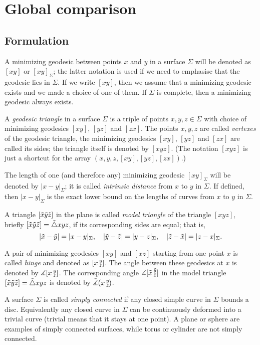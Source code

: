 \chapter{Global comparison}

\section{Formulation}

A minimizing geodesic between points $x$ and $y$ in a surface $\Sigma$ will be denoted as $[xy]$ or $[xy]_\Sigma$;
the latter notation is used if we need to emphasise that the geodesic lies in $\Sigma$.
If we write $[xy]$, then we assume that a minimizing geodesic exists and we made a choice of one of them.
If $\Sigma$ is complete, then a minimizing geodesic always exists. %

A \emph{geodesic triangle} in a surface $\Sigma$ is a triple of points $x,y,z\in \Sigma$ with choice of minimizing geodesics $[xy]$, $[yz]$ and $[zx]$.
The points $x,y,z$ are called \emph{vertexes} of the geodesic triangle,
the minimizing geodesics $[xy]$, $[yz]$ and $[zx]$ are called its sides;
the triangle itself is denoted by $[xyz]$.
(The notation $[xyz]$ is just a shortcut for the array $(x,y,z,[xy], [yz], [zx])$.)

The length of one (and therefore any) minimizing geodesic $[xy]_\Sigma$ will be denoted by $|x-y|_\Sigma$; it is called \emph{intrinsic distance} from $x$ to $y$ in $\Sigma$.
If defined, then $|x-y|_\Sigma$ is the exact lower bound on the lengths of curves from $x$ to $y$ in $\Sigma$. 

A triangle $[\~x\~y\~z]$ in the plane is called \emph{model triangle} of the triangle $[xyz]$,
briefly $[\~x\~y\~z]=\~\triangle xyz$, if its corresponding sides are equal;
that is,
\[|\~x-\~y|=|x-y|_\Sigma,
\quad
|\~y-\~z|=|y-z|_\Sigma,
\quad
|\~z-\~x|=|z-x|_\Sigma.
\]

A pair of minimizing geodesics $[xy]$ and $[xz]$ starting from one point $x$ is called \emph{hinge} and denoted as $\hinge xyz$.
The angle between these geodesics at $x$ is denoted by $\measuredangle\hinge xyz$.
The corresponding angle $\measuredangle\hinge {\~x}{\~y}{\~z}$ in the model triangle $[\~x\~y\~z]=\~\triangle xyz$ is denoted by $\angk xyz$.

A surface $\Sigma$ is called \emph{simply connected} if any closed simple curve in $\Sigma$ bounds a disc.
Equivalently any closed curve in $\Sigma$ can be continuously deformed into a trivial curve (trivial means that it stays at one point).
A plane or sphere are examples of simply connected surfaces, while torus or cylinder are not simply connected.


